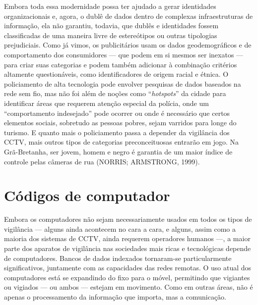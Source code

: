 Embora toda essa modernidade possa ter ajudado a gerar identidades
organizacionais e, agora, o dublê de dados dentro de complexas
infraestruturas de informação, ela não garantiu, todavia, que dublês e
identidades fossem classificadas de uma maneira livre de estereótipos ou
outras tipologias prejudiciais. Como já vimos, os publicitários usam os
dados geodemográficos e de comportamento dos consumidores --- que podem
em si mesmos ser inexatos --- para criar suas categorias e podem também
adicionar à combinação critérios altamente questionáveis, como
identificadores de origem racial e étnica. O policiamento de alta
tecnologia pode envolver pesquisas de dados baseados na rede sem fio,
mas não foi além de noções como ``\emph{hotspots}'' da cidade para
identificar áreas que requerem atenção especial da polícia, onde um
``comportamento indesejado'' pode ocorrer ou onde é necessário que
certos elementos sociais, sobretudo as pessoas pobres, sejam varridos
para longe do turismo. E quanto mais o policiamento passa a depender da
vigilância dos CCTV, mais outros tipos de categorias preconceituosas
entrarão em jogo. Na Grã-Bretanha, ser jovem, homem e negro é garantia
de um maior índice de controle pelas câmeras de rua (NORRIS; ARMSTRONG,
1999).

\section{Códigos de computador}

Embora os computadores não sejam necessariamente usados em todos os
tipos de vigilância --- alguns ainda acontecem no cara a cara, e alguns,
assim como a maioria dos sistemas de CCTV, ainda requerem operadores
humanos ---, a maior parte dos aparatos de vigilância nas sociedades
mais ricas e tecnológicas depende de computadores. Bancos de dados
indexados tornaram-se particularmente significativos, juntamente com as
capacidades das redes remotas. O uso atual dos computadores está se
expandindo do fixo para o móvel, permitindo que vigiantes ou vigiados
--- ou ambos --- estejam em movimento. Como em outras áreas, não é
apenas o processamento da informação que importa, mas a comunicação.

